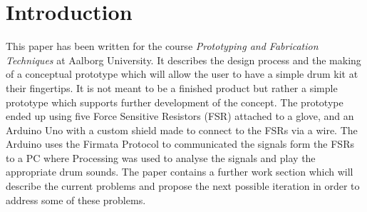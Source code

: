 \section*{Introduction}
\label{Introduktion}
This paper has been written for the course \textit{Prototyping and Fabrication Techniques} at Aalborg University. It describes the design process and the making of a conceptual prototype which will allow the user to have a simple drum kit at their fingertips. It is not meant to be a finished product but rather a simple prototype which supports further development of the concept. 
The prototype ended up using five Force Sensitive Resistors (FSR) attached to a glove, and an Arduino Uno with a custom shield made to connect to the FSRs via a wire. The Arduino uses the Firmata Protocol to communicated the signals form the FSRs to a PC where Processing was used to analyse the signals and play the appropriate drum sounds. The paper contains a further work section which will describe the current problems and propose the next possible iteration in order to address some of these problems.
